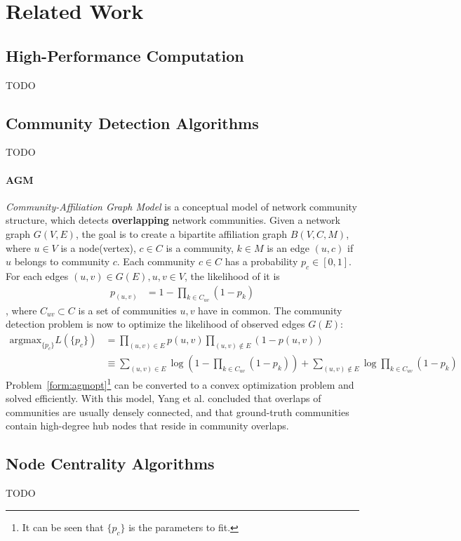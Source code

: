 \section{Related Work}

\subsection{High-Performance Computation}

\par TODO\citep{compiler-for-hpc}

\subsection{Community Detection Algorithms}

\par TODO

\paragraph{AGM} \textit{Community-Affiliation Graph Model}\citep{yang2012structure}
is a conceptual model of network community structure, which detects 
\textbf{overlapping} network communities. Given a network graph $G(V,E)$, the
goal is to create a bipartite affiliation graph $B(V, C, M)$, where
$u\in V$ is a node(vertex), $c\in C$ is a community, 
$k\in M$ is an edge $(u,c)$ if $u$ belongs to community $c$. Each
community $c\in C$ has a probability $p_c\in [0,1]$.
For each edges $(u,v)\in G(E), u,v \in V$, the likelihood of it is 
\begin{align}
    p_(u,v) &= 1- \prod_{k\in C_{uv}}(1-p_k)
\end{align},
where $C_{uv}\subset C$ is a set of communities $u,v$ have in common.
The community detection problem is now to optimize the likelihood of 
observed edges $G(E)$: 
\begin{align} \label{form:agmopt}
    \text{argmax}_{\{p_c\}} L(\{p_c\}) &= \prod_{(u,v)\in E} p(u,v) 
        \prod_{(u,v)\notin E} (1 - p(u,v))\\
    &\equiv \sum_{(u,v)\in E}\log{(1 - \prod_{k\in C_{uv}} (1-p_k))} + 
        \sum_{(u,v)\notin E}\log{\prod_{k\in C_{uv}} (1-p_k)}
\end{align}
Problem~\ref{form:agmopt}\footnote{It can be seen that $\{p_c\}$ is the parameters to fit.}
can be converted to a convex optimization 
problem and solved efficiently\citep{yang2012structure}. 
With this model, Yang et al.\citep{yang2012structure} concluded that overlaps of communities are
usually densely connected, and that ground-truth communities contain
high-degree hub nodes that reside in community overlaps.

\subsection{Node Centrality Algorithms}
\par TODO
